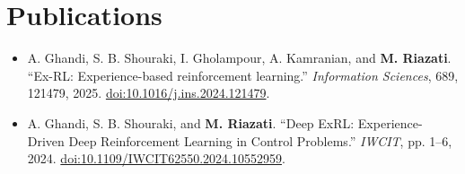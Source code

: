 \section{Publications}
\begin{itemize}
  \item A. Ghandi, S. B. Shouraki, I. Gholampour, A. Kamranian, and \textbf{M. Riazati}. ``Ex-RL: Experience-based reinforcement learning.'' \textit{Information Sciences}, 689, 121479, 2025. \href{https://doi.org/10.1016/j.ins.2024.121479}{doi:10.1016/j.ins.2024.121479}.
  \item A. Ghandi, S. B. Shouraki, and \textbf{M. Riazati}. ``Deep ExRL: Experience-Driven Deep Reinforcement Learning in Control Problems.'' \textit{IWCIT}, pp. 1--6, 2024. \href{https://doi.org/10.1109/IWCIT62550.2024.10552959}{doi:10.1109/IWCIT62550.2024.10552959}.
\end{itemize}
